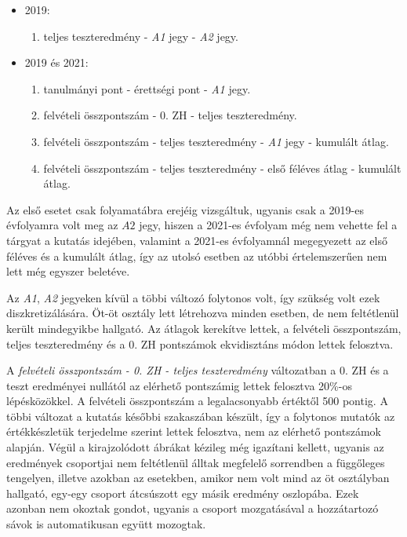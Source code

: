 \documentclass[12pt]{article}
\begin{document}
\begin{itemize}

\item 2019:

\begin{enumerate}
\item teljes teszteredmény - \textit{A1} jegy - \textit{A2} jegy.
\end{enumerate}

\item 2019 és 2021:

\begin{enumerate}
\item tanulmányi pont - érettségi pont - \textit{A1} jegy.
\item felvételi összpontszám - 0. ZH - teljes teszteredmény.
\item felvételi összpontszám - teljes teszteredmény - \textit{A1} jegy - kumulált átlag.
\item felvételi összpontszám - teljes teszteredmény - első féléves átlag - kumulált átlag.
\end{enumerate}

\end{itemize}

Az első esetet csak folyamatábra erejéig vizsgáltuk, ugyanis csak a 2019-es évfolyamra volt meg az $A2$ jegy, hiszen a 2021-es évfolyam még nem vehette fel a tárgyat a kutatás idejében, valamint a 2021-es évfolyamnál megegyezett az első féléves és a kumulált átlag, így az utolsó esetben az utóbbi értelemszerűen nem lett még egyszer beletéve.

Az \textit{A1}, \textit{A2} jegyeken kívül a többi változó folytonos volt, így szükség volt ezek diszkretizálására. Öt-öt osztály lett létrehozva minden esetben, de nem feltétlenül került mindegyikbe hallgató. Az átlagok kerekítve lettek, a felvételi összpontszám, teljes teszteredmény és a 0. ZH pontszámok ekvidisztáns módon lettek felosztva.

A \textit{felvételi összpontszám - 0. ZH - teljes teszteredmény} változatban a 0. ZH és a teszt eredményei nullától az elérhető pontszámig lettek felosztva 20\%-os lépésközökkel. A felvételi összpontszám a legalacsonyabb értéktől 500 pontig. A többi változat a kutatás későbbi szakaszában készült, így a folytonos mutatók az értékkészletük terjedelme szerint lettek felosztva, nem az elérhető pontszámok alapján. Végül a kirajzolódott ábrákat kézileg még igazítani kellett, ugyanis az eredmények csoportjai nem feltétlenül álltak megfelelő sorrendben a függőleges tengelyen, illetve azokban az esetekben, amikor nem volt mind az öt osztályban hallgató, egy-egy csoport átcsúszott egy másik eredmény oszlopába. Ezek azonban nem okoztak gondot, ugyanis a csoport mozgatásával a hozzátartozó sávok is automatikusan együtt mozogtak.
\end{document}
